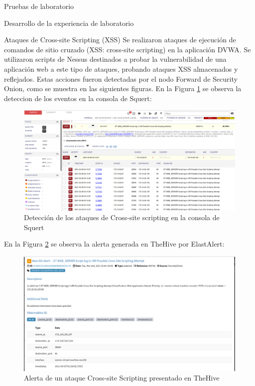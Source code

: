 \begin{section}{Pruebas de laboratorio}
\begin{subsection}{Desarrollo de la experiencia de laboratorio}
\begin{subsubsection} {Ataques de Cross-site Scripting (XSS)}
    Se realizaron ataques de ejecución de comandos de sitio cruzado (XSS: cross-site scripting) en la aplicación DVWA. Se utilizaron scripts de Nessus destinados a probar la vulnerabilidad de una aplicación web a este tipo de ataques, probando ataques XSS almacenados y reflejados.
    Estas acciones fueron detectadas por el nodo Forward de Security Onion, como se muestra en las siguientes figuras. 
    En la Figura \ref{fig:xss-squert} se observa la deteccion de los eventos en la consola de Squert:
   \begin{figure}[H]
    \centering
    \includegraphics[width=1\textwidth]{./iteracion_3_imagenes/xss-squert.png}
    \caption{Detección de los ataques de Cross-site scripting en la consola de Squert}
    \label{fig:xss-squert}
    \end{figure}
    \FloatBarrier 
    En la Figura \ref{fig:xss-thehive} se observa la alerta generada en TheHive por ElastAlert:
    \begin{figure}[H]
    \centering
    \includegraphics[width=1\textwidth]{./iteracion_3_imagenes/xss-thehive.png}
    \caption{Alerta de un ataque Cross-site Scripting presentado en TheHive}
    \label{fig:xss-thehive}
    \end{figure}
    \FloatBarrier 
    \end{subsubsection}
    \end{subsection}
    \end{section}

